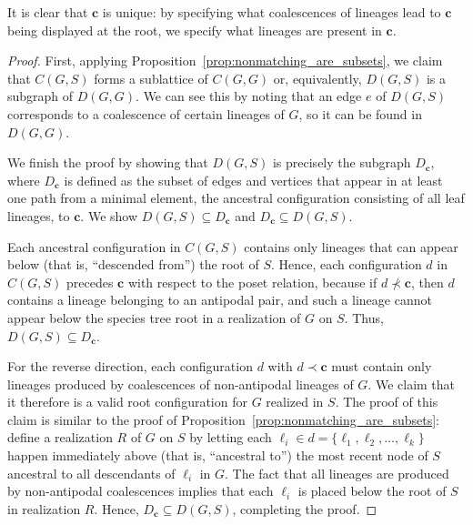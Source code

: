 \documentclass[10pt]{article}
\begin{document}
It is clear that $\mathbf c$ is unique: by specifying what coalescences of lineages lead to $\mathbf c$ being displayed at the root, we specify what lineages are present in $\mathbf c$.

\begin{proof}
First, applying Proposition~\ref{prop:nonmatching_are_subsets}, we claim that $C(G,S)$ forms a sublattice of $C(G,G)$ or, equivalently, $D(G,S)$ is a subgraph of $D(G,G)$. We can see this by noting that an edge $e$ of $D(G,S)$ corresponds to a coalescence of certain lineages of $G$, so it can be found in $D(G,G)$. 

  
We finish the proof by showing that $D(G,S)$ is precisely the subgraph $D_{\mathbf{c}}$, where $D_{\mathbf c}$ is defined as the subset of edges and vertices that appear in at least one path from a minimal element, the ancestral configuration consisting of all leaf lineages, to $\mathbf c$. We show $D(G,S) \subseteq D_{\mathbf c}$ and $D_{\mathbf c} \subseteq D(G,S)$. 

Each ancestral configuration in $C(G,S)$ contains only lineages that can appear below (that is, ``descended from'') the root of $S$. Hence, each configuration $d$ in $C(G,S)$ precedes $\mathbf c$ with respect to the poset relation, because if $d \not\prec \mathbf c$, then $d$ contains a lineage belonging to an antipodal pair, and such a lineage cannot appear below the species tree root in a realization of $G$ on $S$. Thus, $D(G,S) \subseteq D_{\mathbf c}$.

For the reverse direction, each configuration $d$ with $d \prec \mathbf c$ must contain only lineages produced by coalescences of non-antipodal lineages of $G$. We claim that it therefore is a valid root configuration for $G$ realized in $S$. The proof of this claim is similar to the proof of Proposition~\ref{prop:nonmatching_are_subsets}: define a realization $R$ of $G$ on $S$ by letting each $\ell_i \in d = \{\ell_1, \ell_2, \ldots, \ell_k\}$ happen immediately above (that is, ``ancestral to'') the most recent node of $S$ ancestral to all descendants of $\ell_i$ in $G$. The fact that all lineages are produced by non-antipodal coalescences implies that each $\ell_i$ is placed below the root of $S$ in realization $R$. Hence, $D_{\mathbf c} \subseteq D(G,S)$, completing the proof.
\end{proof}
\end{document}
